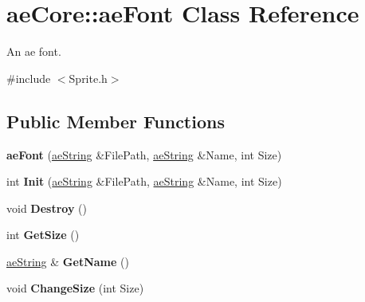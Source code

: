 \hypertarget{classae_core_1_1ae_font}{}\section{ae\+Core\+:\+:ae\+Font Class Reference}
\label{classae_core_1_1ae_font}


An ae font.  




{\ttfamily \#include $<$Sprite.\+h$>$}

\subsection*{Public Member Functions}
\begin{DoxyCompactItemize}
\item 
{\bfseries ae\+Font} (\hyperlink{namespaceae_core_ad6f85aacc0d1fdd85e458e2413e60010}{ae\+String} \&File\+Path, \hyperlink{namespaceae_core_ad6f85aacc0d1fdd85e458e2413e60010}{ae\+String} \&Name, int Size)\hypertarget{classae_core_1_1ae_font_ae393e09d36bae786208a0abbdc6936c7}{}\label{classae_core_1_1ae_font_ae393e09d36bae786208a0abbdc6936c7}

\item 
int {\bfseries Init} (\hyperlink{namespaceae_core_ad6f85aacc0d1fdd85e458e2413e60010}{ae\+String} \&File\+Path, \hyperlink{namespaceae_core_ad6f85aacc0d1fdd85e458e2413e60010}{ae\+String} \&Name, int Size)\hypertarget{classae_core_1_1ae_font_ad73c7edd18dd4148b628c2ed3933fe90}{}\label{classae_core_1_1ae_font_ad73c7edd18dd4148b628c2ed3933fe90}

\item 
void {\bfseries Destroy} ()\hypertarget{classae_core_1_1ae_font_a024a5c7aaef22cb5523a48082b80d71b}{}\label{classae_core_1_1ae_font_a024a5c7aaef22cb5523a48082b80d71b}

\item 
int {\bfseries Get\+Size} ()\hypertarget{classae_core_1_1ae_font_a2c593d71a9c27dde4e76f7d0064ba66c}{}\label{classae_core_1_1ae_font_a2c593d71a9c27dde4e76f7d0064ba66c}

\item 
\hyperlink{namespaceae_core_ad6f85aacc0d1fdd85e458e2413e60010}{ae\+String} \& {\bfseries Get\+Name} ()\hypertarget{classae_core_1_1ae_font_a656058109d674aec5c9524e8455936b0}{}\label{classae_core_1_1ae_font_a656058109d674aec5c9524e8455936b0}

\item 
void {\bfseries Change\+Size} (int Size)\hypertarget{classae_core_1_1ae_font_a2cf79cfabad6234278f87dd09649907d}{}\label{classae_core_1_1ae_font_a2cf79cfabad6234278f87dd09649907d}

\end{DoxyCompactItemize}
